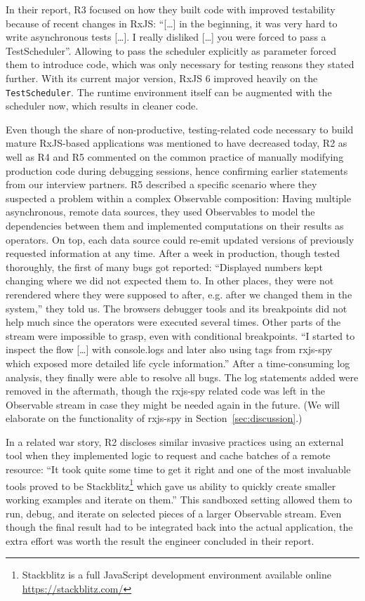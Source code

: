 \documentclass[12pt,a4paper]{article}
\begin{document}
In their report, R3 focused on how they built code with improved testability because of recent changes in RxJS: ``[\dots] in the beginning, it was very hard to write asynchronous tests [\dots]. I really disliked [\dots] you were forced to pass a TestScheduler''. Allowing to pass the scheduler explicitly as parameter forced them to introduce code, which was only necessary for testing reasons they stated further. With its current major version, RxJS 6 improved heavily on the  \texttt{TestScheduler}. The runtime environment itself can be augmented with the scheduler now, which results in cleaner code.

Even though the share of non-productive, testing-related code necessary to build mature RxJS-based applications was mentioned to have decreased today, R2 as well as R4 and R5 commented on the common practice of manually modifying production code during debugging sessions, hence confirming earlier statements from our interview partners. R5 described a specific scenario where they suspected a problem within a complex Observable composition: Having multiple asynchronous, remote data sources, they used Observables to model the dependencies between them and implemented computations on their results as operators. On top, each data source could re-emit updated versions of previously requested information at any time. After a week in production, though tested thoroughly, the first of many bugs got reported: ``Displayed numbers kept changing where we did not expected them to. In other places, they were not rerendered where they were supposed to after, e.g. after we changed them in the system,'' they told us. The browsers debugger tools and its breakpoints did not help much since the operators were executed several times. Other parts of the stream were impossible to grasp, even with conditional breakpoints. ``I started to inspect the flow [\dots] with console.logs and later also using tags from rxjs-spy which exposed more detailed life cycle information.'' After a time-consuming log analysis, they finally were able to resolve all bugs. The log statements added were removed in the aftermath, though the rxjs-spy related code was left in the Observable stream in case they might be needed again in the future. (We will elaborate on the functionality of rxjs-spy in Section~\ref{sec:discussion}.)

In a related war story, R2 discloses similar invasive practices using an external tool when they implemented logic to request and cache batches of a remote resource: ``It took quite some time to get it right and one of the most invaluable tools proved to be Stackblitz\footnote{Stackblitz is a full JavaScript development environment available online \url{https://stackblitz.com/}} which gave us ability to quickly create smaller working examples and iterate on them.'' This sandboxed setting allowed them to run, debug, and iterate on selected pieces of a larger Observable stream. Even though the final result had to be integrated back into the actual application, the extra effort was worth the result the engineer concluded in their report.
\end{document}
